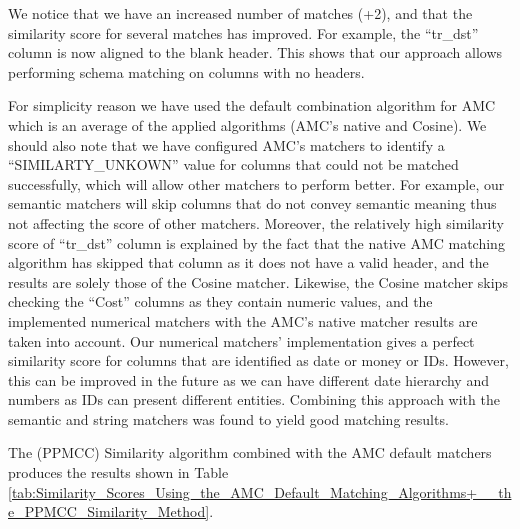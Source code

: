 We notice that we have an increased number of matches (+2), and that the similarity score for several matches has improved. For example, the ``tr\_dst'' column is now aligned to the blank header. This shows that our approach allows performing schema matching on columns with no headers.

For simplicity reason we have used the default combination algorithm for AMC which is an average of the applied algorithms (AMC's native and Cosine). We should also note that we have configured AMC's matchers to identify a ``SIMILARTY\_UNKOWN'' value for columns that could not be matched successfully, which will allow other matchers to perform better. For example, our semantic matchers will skip columns that do not convey semantic meaning thus not affecting the score of other matchers. Moreover, the relatively high similarity score of ``tr\_dst'' column is explained by the fact that the native AMC matching algorithm has skipped that column as it does not have a valid header, and the results are solely those of the Cosine matcher. Likewise, the Cosine matcher skips checking the ``Cost'' columns as they contain numeric values, and the implemented numerical matchers with the AMC's native matcher results are taken into account. Our numerical matchers' implementation gives a perfect similarity score for columns that are identified as date or money or IDs. However, this can be improved in the future as we can have different date hierarchy and numbers as IDs can present different entities. Combining this approach with the semantic and string matchers was found to yield good matching results.

The (PPMCC) Similarity algorithm combined with the AMC default matchers produces the results shown in Table \ref{tab:Similarity_Scores_Using_the_AMC_Default_Matching_Algorithms+__the_PPMCC_Similarity_Method}.


